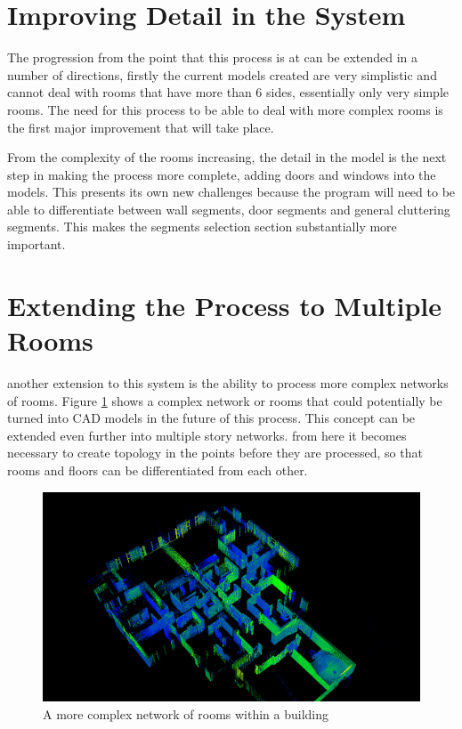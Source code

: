 \section{Improving Detail in the System}

	The progression from the point that this process is at can be extended in a number of directions, firstly the current models created are very simplistic and cannot deal with rooms that have more than 6 sides, essentially only very simple rooms. The need for this process to be able to deal with more complex rooms is the first major improvement that will take place. 
	
	From the complexity of the rooms increasing, the detail in the model is the next step in making the process more complete, adding doors and windows into the models. This presents its own new challenges because the program will need to be able to differentiate between wall segments, door segments and general cluttering segments. This makes the segments selection section substantially more important.
	
\section{Extending the Process to Multiple Rooms}
	
	another extension to this system is the ability to process more complex networks of rooms. Figure \ref{fig:complexscene} shows a complex network or rooms that could potentially be turned into CAD models in the future of this process. This concept can be extended even further into multiple story networks. from here it becomes necessary to create topology in the points before they are processed, so that rooms and floors can be differentiated from each other.
	
	
	\begin{figure}[htb]
		\centering
		\includegraphics[width=1\linewidth]{"Includes/images/Results/complex scene"}
		\caption{A more complex network of rooms within a building}
		\label{fig:complexscene}
	\end{figure}
	
